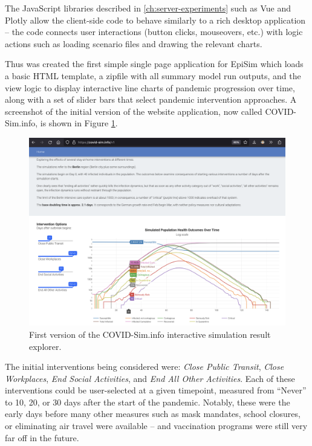 The JavaScript libraries described in \autoref{ch:server-experiments} such as Vue and Plotly allow the client-side code to behave similarly to a rich desktop application -- the code connects user interactions (button clicks, mouseovers, etc.) with logic actions such as loading scenario files and drawing the relevant charts.

Thus was created the first simple single page application for EpiSim which loads a basic HTML template, a zipfile with all summary model run outputs, and the view logic to display interactive line charts of pandemic progression over time, along with a set of slider bars that select pandemic intervention approaches. A screenshot of the initial version of the website application, now called COVID-Sim.info, is shown in Figure \ref{fig:covid-v1}.

\begin{figure}
  \centering
	\begin{minipage}{0.8\textwidth}
    \includegraphics[width=\textwidth]{chapters/21-covid-sim/images/covid-v1.png}
  \caption{First version of the COVID-Sim.info interactive simulation result explorer.}
  \label{fig:covid-v1}
	\end{minipage}
\end{figure}

The initial interventions being considered were: \emph{Close Public Transit}, \emph{Close Workplaces}, \emph{End Social Activities}, and \emph{End All Other Activities}. Each of these interventions could be user-selected at a given timepoint, measured from ``Never'' to 10, 20, or 30 days after the start of the pandemic. Notably, these were the early days before many other measures such as mask mandates, school closures, or eliminating air travel were available -- and vaccination programs were still very far off in the future.

